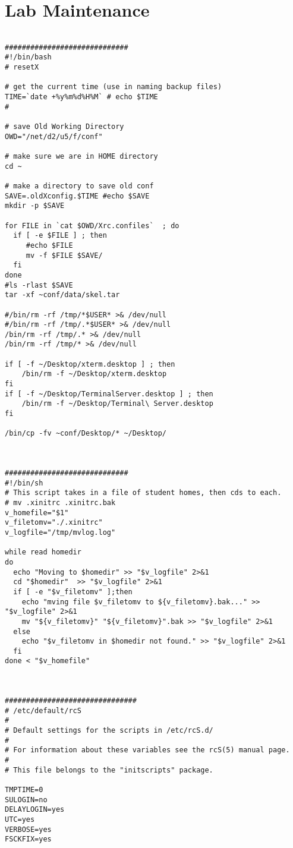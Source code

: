\chapter{Lab Maintenance} \label{ap:lab_maintenance}

\begin{verbatim}

#############################
#!/bin/bash
# resetX

# get the current time (use in naming backup files)
TIME=`date +%y%m%d%H%M` # echo $TIME
#

# save Old Working Directory
OWD="/net/d2/u5/f/conf"

# make sure we are in HOME directory
cd ~

# make a directory to save old conf
SAVE=.oldXconfig.$TIME #echo $SAVE
mkdir -p $SAVE

for FILE in `cat $OWD/Xrc.confiles`  ; do
  if [ -e $FILE ] ; then
     #echo $FILE
     mv -f $FILE $SAVE/
  fi
done
#ls -rlast $SAVE
tar -xf ~conf/data/skel.tar

#/bin/rm -rf /tmp/*$USER* >& /dev/null
#/bin/rm -rf /tmp/.*$USER* >& /dev/null 
/bin/rm -rf /tmp/.* >& /dev/null 
/bin/rm -rf /tmp/* >& /dev/null 

if [ -f ~/Desktop/xterm.desktop ] ; then
	/bin/rm -f ~/Desktop/xterm.desktop
fi
if [ -f ~/Desktop/TerminalServer.desktop ] ; then
	/bin/rm -f ~/Desktop/Terminal\ Server.desktop
fi

/bin/cp -fv ~conf/Desktop/* ~/Desktop/



#############################
#!/bin/sh
# This script takes in a file of student homes, then cds to each.
# mv .xinitrc .xinitrc.bak
v_homefile="$1"
v_filetomv="./.xinitrc"
v_logfile="/tmp/mvlog.log"

while read homedir
do
  echo "Moving to $homedir" >> "$v_logfile" 2>&1
  cd "$homedir"  >> "$v_logfile" 2>&1
  if [ -e "$v_filetomv" ];then
    echo "mving file $v_filetomv to ${v_filetomv}.bak..." >> "$v_logfile" 2>&1
    mv "${v_filetomv}" "${v_filetomv}".bak >> "$v_logfile" 2>&1
  else
    echo "$v_filetomv in $homedir not found." >> "$v_logfile" 2>&1
  fi
done < "$v_homefile"



###############################
# /etc/default/rcS
#
# Default settings for the scripts in /etc/rcS.d/
#
# For information about these variables see the rcS(5) manual page.
#
# This file belongs to the "initscripts" package.

TMPTIME=0
SULOGIN=no
DELAYLOGIN=yes
UTC=yes
VERBOSE=yes
FSCKFIX=yes




\end{verbatim}
